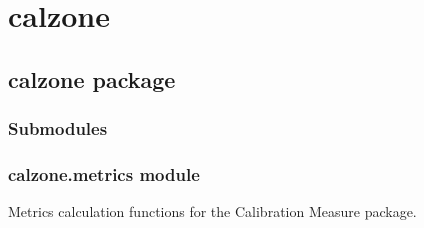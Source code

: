 \documentclass[letterpaper,10pt,english]{sphinxmanual}
\begin{document}
\chapter{calzone}
\label{\detokenize{modules:calzone}}\label{\detokenize{modules::doc}}
\sphinxstepscope


\section{calzone package}
\label{\detokenize{calzone:calzone-package}}\label{\detokenize{calzone::doc}}

\subsection{Submodules}
\label{\detokenize{calzone:submodules}}

\subsection{calzone.metrics module}
\label{\detokenize{calzone:module-calzone.metrics}}\label{\detokenize{calzone:calzone-metrics-module}}
\sphinxAtStartPar
Metrics calculation functions for the Calibration Measure package.
\end{document}

